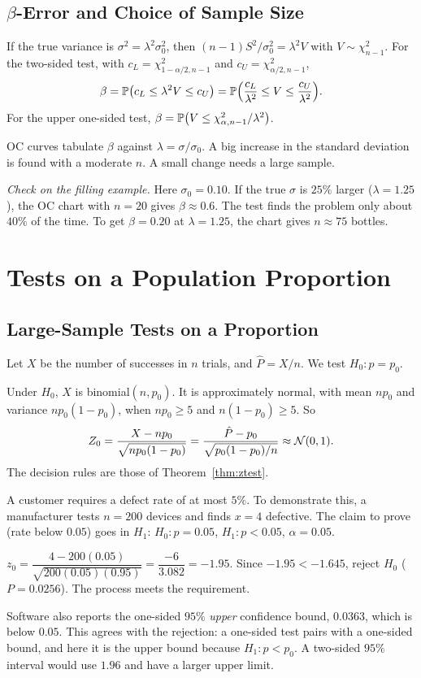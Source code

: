 \subsection{$\beta$-Error and Choice of Sample Size}

If the true variance is $\sigma^2=\lambda^2\sigma_0^2$, then $(n-1)S^2/\sigma_0^2=\lambda^2V$ with $V\sim\chi^2_{n-1}$. For the two-sided test, with $c_L=\chi^2_{1-\alpha/2,n-1}$ and $c_U=\chi^2_{\alpha/2,n-1}$,
\[ \beta=\mathbb{P}\big(c_L\le\lambda^2V\le c_U\big)=\mathbb{P}\Big(\frac{c_L}{\lambda^2}\le V\le\frac{c_U}{\lambda^2}\Big). \]
For the upper one-sided test, $\beta=\mathbb{P}\big(V\le\chi^2_{\alpha,n-1}/\lambda^2\big)$.

OC curves tabulate $\beta$ against $\lambda=\sigma/\sigma_0$. A big increase in the standard deviation is found with a moderate $n$. A small change needs a large sample.

\emph{Check on the filling example.} Here $\sigma_0=0.10$. If the true $\sigma$ is $25\%$ larger ($\lambda=1.25$), the OC chart with $n=20$ gives $\beta\approx0.6$. The test finds the problem only about $40\%$ of the time. To get $\beta=0.20$ at $\lambda=1.25$, the chart gives $n\approx75$ bottles.

\section{Tests on a Population Proportion}

\subsection{Large-Sample Tests on a Proportion}

Let $X$ be the number of successes in $n$ trials, and $\hat{P}=X/n$. We test $H_0:p=p_0$.

Under $H_0$, $X$ is binomial$(n,p_0)$. It is approximately normal, with mean $np_0$ and variance $np_0(1-p_0)$, when $np_0\ge5$ and $n(1-p_0)\ge5$. So
\[ Z_0=\frac{X-np_0}{\sqrt{np_0(1-p_0)}}=\frac{\hat{P}-p_0}{\sqrt{p_0(1-p_0)/n}}\approx\mathcal{N}(0,1). \]
The decision rules are those of Theorem~\ref{thm:ztest}.

\begin{example}\label{ex:proptest}
A customer requires a defect rate of at most $5\%$. To demonstrate this, a manufacturer tests $n=200$ devices and finds $x=4$ defective. The claim to prove (rate below $0.05$) goes in $H_1$: $H_0:p=0.05$, $H_1:p<0.05$, $\alpha=0.05$.

$z_0=\dfrac{4-200(0.05)}{\sqrt{200(0.05)(0.95)}}=\dfrac{-6}{3.082}=-1.95$. Since $-1.95<-1.645$, reject $H_0$ ($P=0.0256$). The process meets the requirement.

Software also reports the one-sided $95\%$ \emph{upper} confidence bound, $0.0363$, which is below $0.05$. This agrees with the rejection: a one-sided test pairs with a one-sided bound, and here it is the upper bound because $H_1:p<p_0$. A two-sided $95\%$ interval would use $1.96$ and have a larger upper limit.
\end{example}


